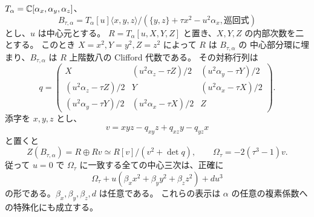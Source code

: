 \begin{proposition}
\label{eco:prop:clifford-center-freedom}
$T_\alpha=\mathbb C[\alpha_x,\alpha_y,\alpha_z]$、
\[
 B_{\tau,\alpha}
 =T_\alpha[u]\langle x,y,z\rangle/
 (\{y,z\}+\tau x^2-u^2\alpha_x,\text{巡回式})
\]
とし、$u$ は中心元とする。
$R=T_\alpha[u,X,Y,Z]$ と置き、$X,Y,Z$ の内部次数を二とする。
このとき $X=x^2,Y=y^2,Z=z^2$ によって $R$ は $B_{\tau,\alpha}$ の
中心部分環に埋まり、$B_{\tau,\alpha}$ は $R$ 上階数八の Clifford 代数である。
その対称行列は
\begin{equation}\label{eco:eq:clifford-matrix}
 q=\begin{pmatrix}
 X&(u^2\alpha_z-\tau Z)/2&(u^2\alpha_y-\tau Y)/2\\
 (u^2\alpha_z-\tau Z)/2&Y&(u^2\alpha_x-\tau X)/2\\
 (u^2\alpha_y-\tau Y)/2&(u^2\alpha_x-\tau X)/2&Z
 \end{pmatrix}.
\end{equation}
添字を $x,y,z$ とし、
\[
 v=xyz-q_{xy}z+q_{xz}y-q_{yz}x
\]
と置くと
\begin{equation}\label{eco:eq:clifford-full-center}
 Z(B_{\tau,\alpha})=R\oplus Rv
       \simeq R[v]/(v^2+\det q),\qquad
 \Omega_\tau=-2(\tau^3-1)v.
\end{equation}
従って $u=0$ で $\Omega_\tau$ に一致する全ての中心三次は、正確に
\begin{equation}\label{eco:eq:all-clifford-lifts}
 \Omega_\tau+u(\beta_xx^2+\beta_yy^2+\beta_zz^2)+du^3
\end{equation}
の形である。$\beta_x,\beta_y,\beta_z,d$ は任意である。
これらの表示は $\alpha$ の任意の複素係数への特殊化にも成立する。
\end{proposition}

